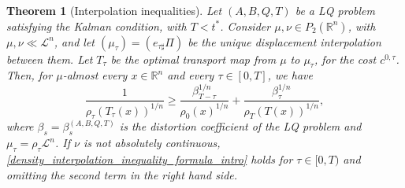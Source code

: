 \documentclass[10pt,a4paper]{amsart}
\newtheorem{thm}{Theorem}
\begin{document}
		\begin{thm}[Interpolation inequalities]\label{density_interpolation_inequality}
Let $(A,B,Q,T)$ be a LQ problem satisfying the Kalman condition, with $T<t^*$. Consider $\mu,\nu\in P_2(\mathbb{R}^n)$, with $\mu, \nu \ll\mathscr{L}^n$, and let $(\mu_\tau)=(e_{\tau\sharp}\Pi)$ be the unique displacement interpolation between them. Let $T_\tau$ be the optimal transport map from $\mu$ to $\mu_\tau$, for the cost $c^{0,\tau}$. Then, for $\mu$-almost every $x\in\mathbb{R}^n$ and every $\tau\in[0,T]$, we have
			\begin{equation}\label{density_interpolation_inequality_formula}
				\frac{1}{\rho_\tau(T_\tau(x))^{1/n}}\geq\frac{\beta_{T-\tau}^{1/n}}{\rho_0(x)^{1/n}} +\frac{\beta_{\tau}^{1/n}}{\rho_T(T(x))^{1/n}},
			\end{equation}
			where $\beta_s=\beta_s^{(A,B,Q,T)}$ is the distortion coefficient of the LQ problem and $\mu_\tau=\rho_\tau\mathscr{L}^n$. 
            If $\nu$ is not absolutely continuous, \eqref{density_interpolation_inequality_formula_intro} holds for $\tau\in[0,T)$ and omitting the second term in the right hand side.
            \end{thm}
\end{document}
